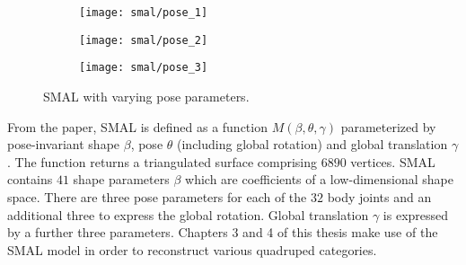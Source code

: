     \begin{figure}[H]
    \centering
    \begin{subfigure}{0.3\linewidth}
    \centering
        \texttt{[image: smal/pose\_1]}
    \end{subfigure}%
    \begin{subfigure}{0.3\linewidth}
    \centering
        \texttt{[image: smal/pose\_2]}
    \end{subfigure}%
    \begin{subfigure}{0.3\linewidth}
        \centering
            \texttt{[image: smal/pose\_3]}
    \end{subfigure}%
    \caption{SMAL with varying pose parameters.}
    \label{fig:smal_model_poses}
\end{figure}

From the paper, SMAL is defined as a function $M(\beta, \theta, \gamma)$ parameterized by pose-invariant shape $\beta$, pose $\theta$ (including global rotation) and global translation $\gamma$. The function returns a triangulated surface comprising $6890$ vertices. SMAL contains $41$ shape parameters $\beta$ which are coefficients of a low-dimensional shape space. There are three pose parameters for each of the $32$ body joints and an additional three to express the global rotation. Global translation $\gamma$ is expressed by a further three parameters. Chapters 3 and 4 of this thesis make use of the SMAL model in order to reconstruct various quadruped categories.

